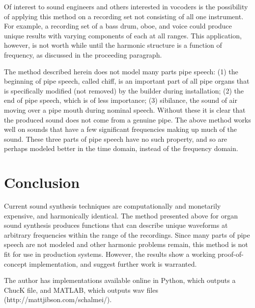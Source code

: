 \documentclass[twocolumn]{article}
\begin{document}
Of interest to sound engineers and others interested in vocoders is the possibility of applying this method on a recording set not consisting of all one instrument. For example, a recording set of a bass drum, oboe, and voice could produce unique results with varying components of each at all ranges. This application, however, is not worth while until the harmonic structure is a function of frequency, as discussed in the proceeding paragraph.

The method described herein does not model many parts pipe speech: (1) the beginning of pipe speech, called chiff, is an important part of all pipe organs that is specifically modified (not removed) by the builder during installation; (2) the end of pipe speech, which is of less importance; (3) sibilance, the sound of air moving over a pipe mouth during nominal speech. Without these it is clear that the produced sound does not come from a genuine pipe. The above method works well on sounds that have a few significant frequencies making up much of the sound. These three parts of pipe speech have no such property, and so are perhaps modeled better in the time domain, instead of the frequency domain.

\section{Conclusion}

Current sound synthesis techniques are computationally and monetarily expensive, and harmonically identical. The method presented above for organ sound synthesis produces functions that can describe unique waveforms at arbitrary frequencies within the range of the recordings. Since many parts of pipe speech are not modeled and other harmonic problems remain, this method is not fit for use in production systems. However, the results show a working proof-of-concept implementation, and suggest further work is warranted.

The author has implementations available online in Python, which outputs a ChucK file, and MATLAB, which outputs wav files (http://mattjibson.com/schalmei/).

{}

\end{document}
